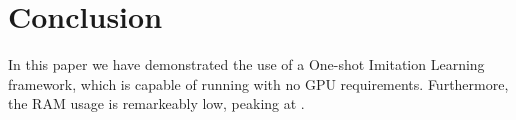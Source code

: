 \chapter{Conclusion}
\label{chap:conclusion}

In this paper we have demonstrated the use of a One-shot Imitation Learning framework, which is capable of running with no GPU requirements. Furthermore, the RAM usage is remarkeably low, peaking at .